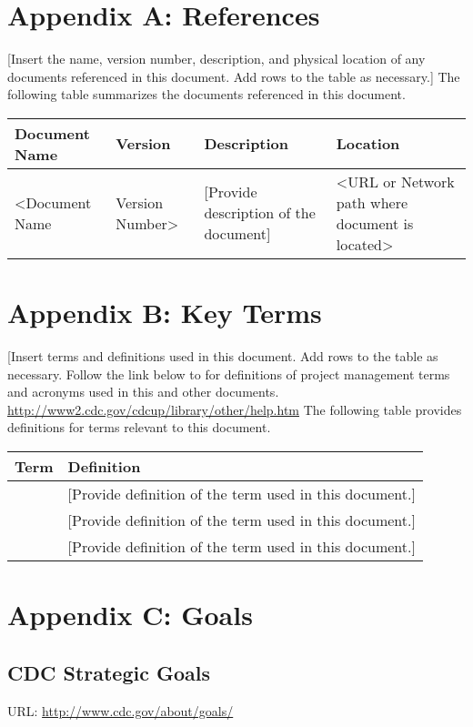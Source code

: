 \documentclass[11pt]{article}
\begin{document}
\section{Appendix A: References}
\label{sec:org37142d2}
[Insert the name, version number, description, and physical location of any documents referenced in this document.  Add rows to the table as necessary.] 
The following table summarizes the documents referenced in this document.
\begin{center}
\begin{tabular}{llll}
Document Name & Version & Description & Location\\
\hline
<Document Name & Version Number> & [Provide description of the document] & <URL or Network path where document is located>\\
\end{tabular}
\end{center}


\section{Appendix B: Key Terms}
\label{sec:org374c6ed}
[Insert terms and definitions used in this document.  Add rows to the table as necessary. Follow the link below to for definitions of project management terms and acronyms used in this and other documents.
\url{http://www2.cdc.gov/cdcup/library/other/help.htm}
The following table provides definitions for terms relevant to this document.
\begin{center}
\begin{tabular}{ll}
Term & Definition\\
\hline
[Insert Term] & [Provide definition of the term used in this document.]\\
[Insert Term] & [Provide definition of the term used in this document.]\\
[Insert Term] & [Provide definition of the term used in this document.]\\
\end{tabular}
\end{center}


\section{Appendix C: Goals}
\label{sec:org64a7a8d}
\subsection{CDC Strategic Goals}
\label{sec:orge4d5ebf}
URL: \url{http://www.cdc.gov/about/goals/}
\end{document}
